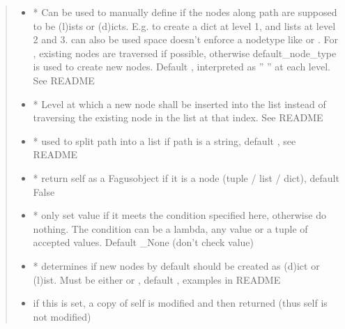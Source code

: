 \documentclass[a4paper,10pt,english]{sphinxmanual}
\begin{document}
\begin{fulllineitems}
\begin{fulllineitems}
\begin{quote}
\begin{description}
\begin{itemize}
\item {}
\sphinxAtStartPar
{} \textendash{} * Can be used to manually define if the nodes along path are supposed to be (l)ists or
(d)icts. E.g.  to create a dict at level 1, and lists at level 2 and 3.  can also be
used \textendash{} space doesn’t enforce a node\sphinxhyphen{}type like  or . For , existing nodes are
traversed if possible, otherwise default\_node\_type is used to create new nodes. Default ,
interpreted as ” ” at each level. See README

\item {}
\sphinxAtStartPar
{} \textendash{} * Level at which a new node shall be inserted into the list instead of traversing the
existing node in the list at that index. See README

\item {}
\sphinxAtStartPar
{} \textendash{} * used to split path into a list if path is a string, default , see README

\item {}
\sphinxAtStartPar
{} \textendash{} * return self as a Fagus\sphinxhyphen{}object if it is a node (tuple / list / dict), default False

\item {}
\sphinxAtStartPar
{} \textendash{} * only set value if it meets the condition specified here, otherwise do nothing. The condition can
be a lambda, any value or a tuple of accepted values. Default \_None (don’t check value)

\item {}
\sphinxAtStartPar
{} \textendash{} * determines if new nodes by default should be created as (d)ict or (l)ist. Must be
either  or , default , examples in README

\item {}
\sphinxAtStartPar
{} \textendash{} if this is set, a copy of self is modified and then returned (thus self is not modified)


\end{itemize}
\end{description}
\end{quote}
\end{fulllineitems}
\end{fulllineitems}
\end{document}

